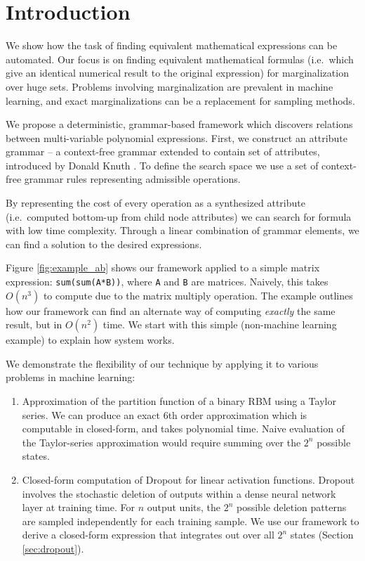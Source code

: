 \section{Introduction} \label{introduction} 

We show how the task of finding equivalent
mathematical expressions can be automated. Our focus is on finding equivalent
mathematical formulas (i.e.~which give an identical numerical result
to the original expression) for marginalization over huge sets. 
Problems involving marginalization are prevalent in machine learning, and 
exact marginalizations can be a replacement for sampling methods.

We propose a deterministic, grammar-based framework which discovers
relations between multi-variable polynomial expressions. First, we
construct an attribute grammar -- a context-free grammar extended to
contain set of attributes, introduced by Donald Knuth
\cite{knuth1968semantics}. To define the search space we use a set of
context-free grammar rules representing admissible operations. 

\noindent
By representing the cost of every operation as a synthesized attribute
(i.e.~computed bottom-up from child node attributes) we can search for
formula with low time complexity. Through a linear combination of
grammar elements, we can find a solution to the desired
expressions. 


Figure \ref{fig:example_ab} shows our framework applied to a simple matrix expression:
\texttt{sum(sum(A*B))}, where \texttt{A} and \texttt{B} are matrices. Naively, this takes $O(n^3)$ to compute due to
the matrix multiply operation. The example outlines how our framework
can find an alternate way of computing {\em exactly} the same result,
but in $O(n^2)$ time. We start with this simple (non-machine learning example) to
explain how system works.

We demonstrate the flexibility of our technique by applying it to 
various problems in machine learning: 
\begin{enumerate}
\vspace{-2mm}
\item Approximation of the partition function of a binary RBM using a
  Taylor series. We can produce an exact 6th order 
  approximation which is
  computable in closed-form, and takes polynomial time.
  Naive evaluation of the Taylor-series
  approximation would require summing over the $2^n$ possible states.   
\item Closed-form computation of Dropout for linear activation functions. 
  Dropout \cite{hinton2012improving}
  involves the  stochastic deletion of outputs within a dense neural
  network layer at training time. For $n$ output units, the $2^n$
  possible deletion patterns are sampled independently for each
  training sample. We use our framework to derive a closed-form
  expression that integrates out over all $2^n$ states (Section \ref{sec:dropout}).
\end{enumerate}
\vspace{-2mm}


